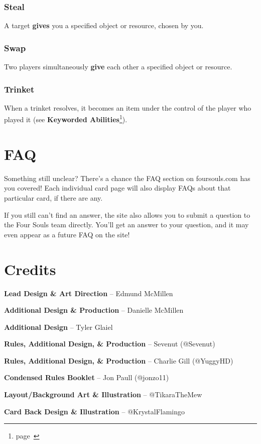 \documentclass[
  fontsize=10pt,
  paper=a5,
  version=last,
  chapterprefix=true,
  bindingoffset=5mm,
  ]{scrbook}
\begin{document}
    \subsection*{Steal}
    A target \textbf{gives} you a specified object or resource, chosen by you.
    \subsection*{Swap}
    Two players simultaneously \textbf{give} each other a specified object or resource.
    \subsection*{Trinket}
    When a trinket resolves, it becomes an item under the control of the player who played it (see \textbf{Keyworded Abilities}\footnote{page~\pageref{keyworded}}).

    \chapter{FAQ}
    Something still unclear? There’s a chance the FAQ section on foursouls.com has you covered! Each individual card page will also display FAQs about that particular card, if there are any.

    If you still can’t find an answer, the site also allows you to submit a question to the Four Souls team directly. You’ll get an answer to your question, and it may even appear as a future FAQ on the site!

    \chapter{Credits}
    \textbf{Lead Design \& Art Direction} – Edmund McMillen

    \textbf{Additional Design \& Production} – Danielle McMillen

    \textbf{Additional Design} – Tyler Glaiel

    \textbf{Rules, Additional Design, \& Production} – Sevenut (@Sevenut)

    \textbf{Rules, Additional Design, \& Production} – Charlie Gill (@YuggyHD)

    \textbf{Condensed Rules Booklet} – Jon Paull (@jonzo11)

    \textbf{Layout/Background Art \& Illustration} – @TikaraTheMew

    \textbf{Card Back Design \& Illustration} – @KrystalFlamingo
\end{document}
